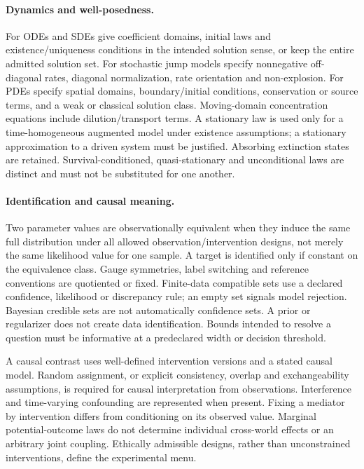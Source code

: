 \documentclass[11pt]{article}
\begin{document}
\paragraph{Dynamics and well-posedness.}
For ODEs and SDEs give coefficient domains, initial laws and existence/uniqueness conditions in the intended solution sense, or keep the entire admitted solution set. For stochastic jump models specify nonnegative off-diagonal rates, diagonal normalization, rate orientation and non-explosion. For PDEs specify spatial domains, boundary/initial conditions, conservation or source terms, and a weak or classical solution class. Moving-domain concentration equations include dilution/transport terms. A stationary law is used only for a time-homogeneous augmented model under existence assumptions; a stationary approximation to a driven system must be justified. Absorbing extinction states are retained. Survival-conditioned, quasi-stationary and unconditional laws are distinct and must not be substituted for one another.

\paragraph{Identification and causal meaning.}
Two parameter values are observationally equivalent when they induce the same full distribution under all allowed observation/intervention designs, not merely the same likelihood value for one sample. A target is identified only if constant on the equivalence class. Gauge symmetries, label switching and reference conventions are quotiented or fixed. Finite-data compatible sets use a declared confidence, likelihood or discrepancy rule; an empty set signals model rejection. Bayesian credible sets are not automatically confidence sets. A prior or regularizer does not create data identification. Bounds intended to resolve a question must be informative at a predeclared width or decision threshold.

A causal contrast uses well-defined intervention versions and a stated causal model. Random assignment, or explicit consistency, overlap and exchangeability assumptions, is required for causal interpretation from observations. Interference and time-varying confounding are represented when present. Fixing a mediator by intervention differs from conditioning on its observed value. Marginal potential-outcome laws do not determine individual cross-world effects or an arbitrary joint coupling. Ethically admissible designs, rather than unconstrained interventions, define the experimental menu.
\end{document}
